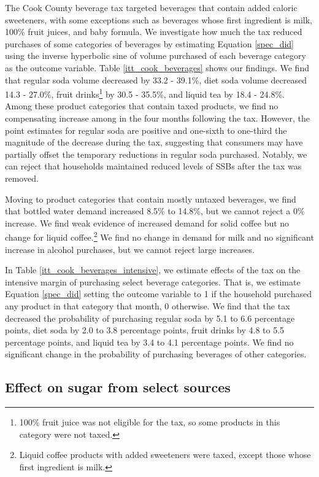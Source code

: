 \documentclass[12pt]{article}
\begin{document}
The Cook County beverage tax targeted beverages that contain added caloric sweeteners, with some exceptions such as beverages whose first ingredient is milk, 100\% fruit juices, and baby formula. We investigate how much the tax reduced purchases of some categories of beverages by estimating Equation \ref{spec_did} using the inverse hyperbolic sine of volume purchased of each beverage category as the outcome variable. Table \ref{itt_cook_beverages} shows our findings. We find that regular soda volume decreased by 33.2 - 39.1\%, diet soda volume decreased 14.3 - 27.0\%, fruit drinks\footnote{100\% fruit juice was not eligible for the tax, so some products in this category were not taxed.} by 30.5 - 35.5\%, and liquid tea by 18.4 - 24.8\%.%
Among these product categories that contain taxed products, we find no compensating increase among in the four months following the tax. However, the point estimates for regular soda are positive and one-sixth to one-third the magnitude of the decrease during the tax, suggesting that consumers may have partially offset the temporary reductions in regular soda purchased. Notably, we can reject that households maintained reduced levels of SSBs after the tax was removed.

Moving to product categories that contain mostly untaxed beverages, we find that bottled water demand increased 8.5\% to 14.8\%, but we cannot reject a 0\% increase. We find weak evidence of increased demand for solid coffee but no change for liquid coffee.\footnote{Liquid coffee products with added sweeteners were taxed, except those whose first ingredient is milk.} We find no change in demand for milk and no significant increase in alcohol purchases, but we cannot reject large increases.

In Table \ref{itt_cook_beverages_intensive}, we estimate effects of the tax on the intensive margin of purchasing select beverage categories. That is, we estimate Equation \ref{spec_did} setting the outcome variable to 1 if the household purchased any product in that category that month, 0 otherwise. We find that the tax decreased the probability of purchasing regular soda by 5.1 to 6.6 percentage points, diet soda by 2.0 to 3.8 percentage points, fruit drinks by 4.8 to 5.5 percentage points, and liquid tea by 3.4 to 4.1 percentage points. We find no significant change in the probability of purchasing beverages of other categories.

\subsection{Effect on sugar from select sources}
\end{document}
